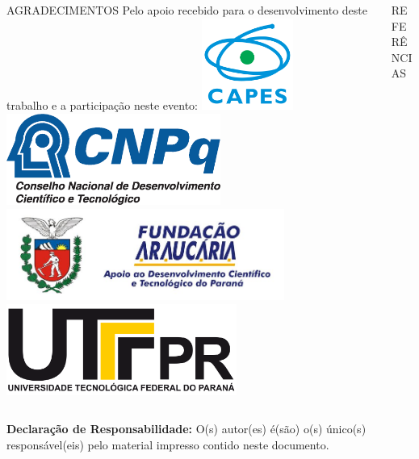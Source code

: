 \documentclass[final]{beamer}
\begin{document}
\begin{frame}[t, fragile = singleslide]{}
\begin{columns}[t]
\begin{column}{0.45\textwidth}
\begin{block}{AGRADECIMENTOS}
\footnotesize
Pelo apoio recebido para o desenvolvimento deste trabalho e a participação neste evento:
\vfill
\includegraphics[height = 30mm]{./Logos/logo-capes}
\hspace*{5mm}
\includegraphics[height = 30mm]{./Logos/logo-cnpq}
\hspace*{5mm}
\includegraphics[height = 30mm]{./Logos/logo-fa}
\hspace*{5mm}
\includegraphics[height = 30mm]{./Logos/logo-utfpr}
\end{block}

\end{column}

\begin{column}{0.45\textwidth}

\begin{block}{REFERÊNCIAS}
\printbibliography[heading = none]
\end{block}

\end{column}

\end{columns}

\begin{columns}[t]

\begin{column}{0.945\textwidth}
\vfill
\begin{tiny}
\textbf{Declaração de Responsabilidade:} O(s) autor(es) é(são) o(s) único(s) responsável(eis) pelo material impresso contido neste documento.
\end{tiny}
\end{column}

\end{columns}

\end{frame}

\end{document}
